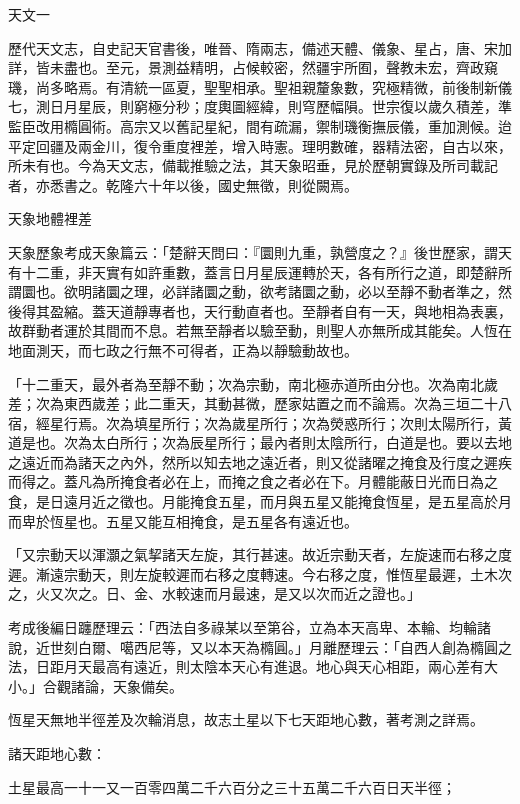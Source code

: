 
\begin{pinyinscope}
天文一

歷代天文志，自史記天官書後，唯晉、隋兩志，備述天體、儀象、星占，唐、宋加詳，皆未盡也。至元，景測益精明，占候較密，然疆宇所囿，聲教未宏，齊政窺璣，尚多略焉。有清統一區夏，聖聖相承。聖祖親釐象數，究極精微，前後制新儀七，測日月星辰，則窮極分秒；度輿圖經緯，則穹歷幅隕。世宗復以歲久積差，準監臣改用橢圓術。高宗又以舊記星紀，間有疏漏，禦制璣衡撫辰儀，重加測候。迨平定回疆及兩金川，復令重度裡差，增入時憲。理明數確，器精法密，自古以來，所未有也。今為天文志，備載推驗之法，其天象昭垂，見於歷朝實錄及所司載記者，亦悉書之。乾隆六十年以後，國史無徵，則從闕焉。

天象地體裡差

天象歷象考成天象篇云：「楚辭天問曰：『圜則九重，孰營度之？』後世歷家，謂天有十二重，非天實有如許重數，蓋言日月星辰運轉於天，各有所行之道，即楚辭所謂圜也。欲明諸圜之理，必詳諸圜之動，欲考諸圜之動，必以至靜不動者準之，然後得其盈縮。蓋天道靜專者也，天行動直者也。至靜者自有一天，與地相為表裏，故群動者運於其間而不息。若無至靜者以驗至動，則聖人亦無所成其能矣。人恆在地面測天，而七政之行無不可得者，正為以靜驗動故也。

「十二重天，最外者為至靜不動；次為宗動，南北極赤道所由分也。次為南北歲差；次為東西歲差；此二重天，其動甚微，歷家姑置之而不論焉。次為三垣二十八宿，經星行焉。次為填星所行；次為歲星所行；次為熒惑所行；次則太陽所行，黃道是也。次為太白所行；次為辰星所行；最內者則太陰所行，白道是也。要以去地之遠近而為諸天之內外，然所以知去地之遠近者，則又從諸曜之掩食及行度之遲疾而得之。蓋凡為所掩食者必在上，而掩之食之者必在下。月體能蔽日光而日為之食，是日遠月近之徵也。月能掩食五星，而月與五星又能掩食恆星，是五星高於月而卑於恆星也。五星又能互相掩食，是五星各有遠近也。

「又宗動天以渾灝之氣挈諸天左旋，其行甚速。故近宗動天者，左旋速而右移之度遲。漸遠宗動天，則左旋較遲而右移之度轉速。今右移之度，惟恆星最遲，土木次之，火又次之。日、金、水較速而月最速，是又以次而近之證也。」

考成後編日躔歷理云：「西法自多祿某以至第谷，立為本天高卑、本輪、均輪諸說，近世刻白爾、噶西尼等，又以本天為橢圓。」月離歷理云：「自西人創為橢圓之法，日距月天最高有遠近，則太陰本天心有進退。地心與天心相距，兩心差有大小。」合觀諸論，天象備矣。

恆星天無地半徑差及次輪消息，故志土星以下七天距地心數，著考測之詳焉。

諸天距地心數：

土星最高一十一又一百零四萬二千六百分之三十五萬二千六百日天半徑；


\end{pinyinscope}
